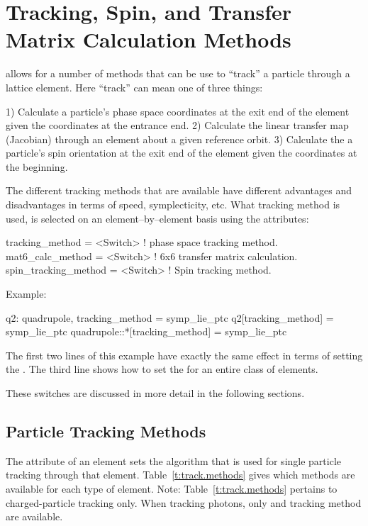 \chapter{Tracking, Spin, and Transfer Matrix Calculation Methods}
\label{c:methods}

\bmad allows for a number of methods that can be use to ``track'' a particle through a lattice
element. Here ``track'' can mean one of three things:
\begin{example}
  1) Calculate a particle's phase space coordinates at the exit 
     end of the element given the coordinates at the entrance end.
  2) Calculate the linear transfer map (Jacobian) through an element
     about a given reference orbit.
  3) Calculate the a particle's spin orientation at the exit end 
     of the element given the coordinates at the beginning.
\end{example}
The different tracking methods that are available have different advantages and disadvantages in
terms of speed, symplecticity, etc.  What tracking method is used, is selected on an
element--by--element basis using the attributes:
\begin{example}
  tracking_method      = <Switch>   ! phase space tracking method.
  mat6_calc_method     = <Switch>   ! 6x6 transfer matrix calculation.
  spin_tracking_method = <Switch>   ! Spin tracking method.
\end{example}
Example:
\begin{example}
  q2: quadrupole, tracking_method = symp_lie_ptc
  q2[tracking_method] = symp_lie_ptc
  quadrupole::*[tracking_method] = symp_lie_ptc
\end{example}
The first two lines of this example have exactly the same effect in terms of setting the
. The third line shows how to set the  for an entire class
of elements.

These switches are discussed in more detail in the following sections.

\section{Particle Tracking Methods}
\label{s:tkm}

The  attribute of an element sets the algorithm that is used for single particle
tracking through that element.  Table~\ref{t:track.methods} gives which methods are available for
each type of element. Note: Table~\ref{t:track.methods} pertains to charged-particle tracking only.
When tracking photons, only  and  tracking method are available.

